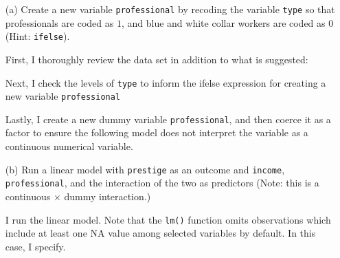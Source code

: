 \documentclass[12pt,letterpaper]{article}
\begin{document}
\newpage
\begin{enumerate}
	
	\item [(a)]
	Create a new variable \texttt{professional} by recoding the variable \texttt{type} so that professionals are coded as $1$, and blue and white collar workers are coded as $0$ (Hint: \texttt{ifelse}).
	
	\noindent First, I thoroughly review the data set in addition to what is suggested:
	
	  
	
	\noindent Next, I check the levels of \texttt{type} to inform the ifelse expression for creating a new variable \texttt{professional}
	
	

	\noindent Lastly, I create a new dummy variable \texttt{professional}, and then coerce it as a factor to ensure the following model does not interpret the variable as a continuous numerical variable.

	
	
	\item [(b)]
	Run a linear model with \texttt{prestige} as an outcome and \texttt{income}, \texttt{professional}, and the interaction of the two as predictors (Note: this is a continuous $\times$ dummy interaction.)
	
	\noindent I run the linear model. Note that the \texttt{lm()} function omits observations which include at least one NA value among selected variables by default. In this case, I specify.

	
	

\end{enumerate}
\end{document}
